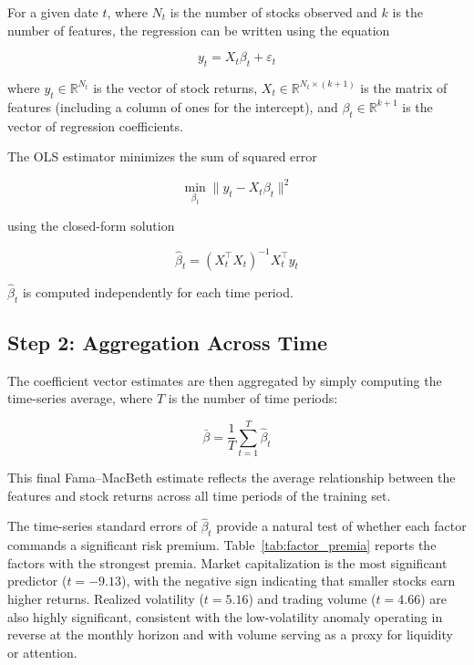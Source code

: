 \documentclass[11pt]{article}
\begin{document}
For a given date $t$, where $N_t$ is the number of stocks observed and $k$ is the number of features, the regression can be written using the equation

\begin{equation}
    y_t = X_t \beta_t + \varepsilon_t
\end{equation}

where $y_t \in \mathbb{R}^{N_t}$ is the vector of stock returns, $X_t \in \mathbb{R}^{N_t \times (k+1)}$ is the matrix of features (including a column of ones for the intercept), and $\beta_t \in \mathbb{R}^{k+1}$ is the vector of regression coefficients.

The OLS estimator minimizes the sum of squared error

\begin{equation}
    \min_{\beta_t} \| y_t - X_t \beta_t \|^2
\end{equation}

using the closed-form solution

\begin{equation}
    \hat{\beta}_t = (X_t^{\intercal} X_t)^{-1} X_t^{\intercal} y_t
\end{equation}

$\hat{\beta}_t$ is computed independently for each time period.

\subsection{Step 2: Aggregation Across Time}

The coefficient vector estimates are then aggregated by simply computing the time-series average, where $T$ is the number of time periods:

\begin{equation}
    \bar{\beta} = \frac{1}{T}\sum_{t=1}^{T} \hat{\beta}_t
\end{equation}

This final Fama--MacBeth estimate reflects the average relationship between the features and stock returns across all time periods of the training set.

The time-series standard errors of $\hat{\beta}_t$ provide a natural test of whether each factor commands a significant risk premium. Table~\ref{tab:factor_premia} reports the factors with the strongest premia. Market capitalization is the most significant predictor ($t = -9.13$), with the negative sign indicating that smaller stocks earn higher returns. Realized volatility ($t = 5.16$) and trading volume ($t = 4.66$) are also highly significant, consistent with the low-volatility anomaly operating in reverse at the monthly horizon and with volume serving as a proxy for liquidity or attention.
\end{document}
